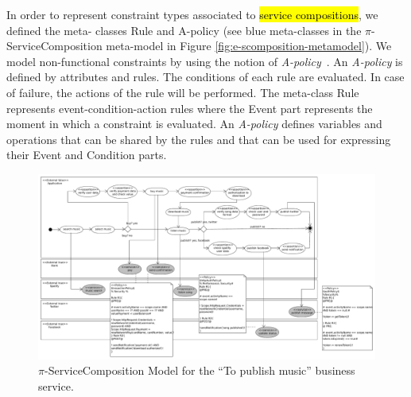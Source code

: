 \documentclass{singlecol-new}
\theoremstyle{TH}{
\newtheorem{lemma}{Lemma}
\newtheorem{theorem}[lemma]{Theorem}
\newtheorem{corrolary}[lemma]{Corrolary}
\newtheorem{conjecture}[lemma]{Conjecture}
\newtheorem{proposition}[lemma]{Proposition}
\newtheorem{claim}[lemma]{Claim}
\newtheorem{stheorem}[lemma]{Wrong Theorem}
\newtheorem{algorithm}{Algorithm}
}
\theoremstyle{THrm}{
\newtheorem{definition}{Definition}[section]
\newtheorem{question}{Question}[section]
\newtheorem{remark}{Remark}
\newtheorem{scheme}{Scheme}
}
\theoremstyle{THhit}{
\newtheorem{case}{Case}[section]
}
\theoremstyle{THhsl}{
\newtheorem{example}{Example}
}
\begin{document}
\begin{compactitem}
\item In order to represent constraint types associated to \hl{service compositions}, we defined the me\-ta- classes {\sc Rule} and {\sc A-policy} (see blue
 meta-classes in the $\pi$-Serv\-ice\-Com\-po\-si\-tion meta-model in Figure \ref{fig:e-scomposition-metamodel}).
We model non-func\-tion\-al constraints by using the notion of {\em A-policy}~\cite{Espinosa-Oviedo2011a,CIC:eovszmc09c}.
An {\em A-policy} is defined by attributes and rules.
The conditions of each rule are evaluated.
In case of failure, the actions of the rule will be performed.
The meta-class {\sc Rule} represents event-condition-action rules where the {\sc Event} part represents the moment in which a constraint  is evaluated.
An {\em A-policy} defines variables and operations that can be shared by the rules and that can be used for expressing their Event and Condition parts.

\end{compactitem}

\begin{figure}[h]
\centering
\includegraphics[width=1\textwidth]{./figures/piServiceComposition-toPublishMusic}
\caption{$\pi$-ServiceComposition Model for the ``To publish music'' business service.}
\label{fig:servicecompositionmodel}
\end{figure}
\end{document}
